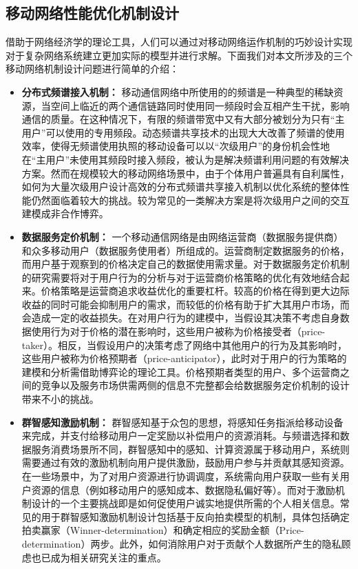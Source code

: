 \subsection{移动网络性能优化机制设计}
借助于网络经济学的理论工具，人们可以通过对移动网络运作机制的巧妙设计实现对于复杂网络系统建立更加实际的模型并进行求解。下面我们对本文所涉及的三个移动网络机制设计问题进行简单的介绍：
\begin{itemize}
\item \textbf{分布式频谱接入机制：} 移动通信网络中所使用的的频谱是一种典型的稀缺资源，当空间上临近的两个通信链路同时使用同一频段时会互相产生干扰，影响通信的质量。在这种情况下，有限的频谱带宽中又有大部分被划分为只有“主用户”可以使用的专用频段。动态频谱共享技术的出现大大改善了频谱的使用效率，使得无频谱使用执照的移动设备可以以“次级用户”的身份机会性地在“主用户”未使用其频段时接入频段，被认为是解决频谱利用问题的有效解决方案。然而在规模较大的移动网络场景中，由于个体用户普遍具有自利属性，如何为大量次级用户设计高效的分布式频谱共享接入机制以优化系统的整体性能仍然面临着较大的挑战。较为常见的一类解决方案是将次级用户之间的交互建模成非合作博弈\cite{wang2010game, chen2012spatial}。


\item \textbf{数据服务定价机制：} 一个移动通信网络是由网络运营商（数据服务提供商）和众多移动用户（数据服务使用者）所组成的。运营商制定数据服务的价格，而用户基于观察到的价格决定自己的数据使用需求量。对于数据服务定价机制的研究需要将对于用户行为的分析与对于运营商价格策略的优化有效地结合起来。价格策略是运营商追求收益优化的重要杠杆。较高的价格在得到更大边际收益的同时可能会抑制用户的需求，而较低的价格有助于扩大其用户市场，而会造成一定的收益损失。在对用户行为的建模中，当假设其决策不考虑自身数据使用行为对于价格的潜在影响时，这些用户被称为价格接受者（price-taker）。相反，当假设用户的决策考虑了网络中其他用户的行为及其影响时，这些用户被称为价格预期者（price-anticipator），此时对于用户的行为策略的建模和分析需借助博弈论的理论工具。价格预期者类型的用户、多个运营商之间的竞争以及服务市场供需两侧的信息不完整都会给数据服务定价机制的设计带来不小的挑战。

\item \textbf{群智感知激励机制：} 群智感知基于众包的思想，将感知任务指派给移动设备来完成，并支付给移动用户一定奖励以补偿用户的资源消耗。与频谱选择和数据服务消费场景所不同，群智感知中的感知、计算资源属于移动用户，系统则需要通过有效的激励机制向用户提供激励，鼓励用户参与并贡献其感知资源。在一些场景中，为了对用户资源进行协调调度，系统需向用户获取一些有关用户资源的信息（例如移动用户的感知成本、数据隐私偏好等）。而对于激励机制设计的一个主要挑战即是如何促使用户诚实地提供所需的个人相关信息。常见的用于群智感知激励机制设计包括基于反向拍卖模型的机制\cite{yang2012crowdsourcing}，具体包括确定拍卖赢家（Winner-determination）和确定相应的奖励金额（Price-determination）两步。此外，如何消除用户对于贡献个人数据所产生的隐私顾虑也已成为相关研究关注的重点。
\end{itemize}

